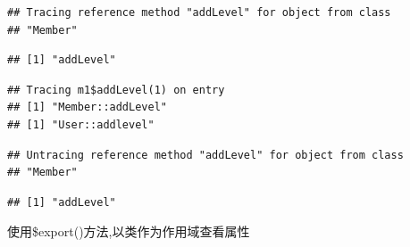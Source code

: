 \documentclass[]{book}
\newenvironment{Shaded}{\begin{snugshade}}{\end{snugshade}}
\newcommand{\KeywordTok}[1]{\textcolor[rgb]{0.13,0.29,0.53}{\textbf{#1}}}
\newcommand{\DecValTok}[1]{\textcolor[rgb]{0.00,0.00,0.81}{#1}}
\newcommand{\StringTok}[1]{\textcolor[rgb]{0.31,0.60,0.02}{#1}}
\newcommand{\CommentTok}[1]{\textcolor[rgb]{0.56,0.35,0.01}{\textit{#1}}}
\newcommand{\OperatorTok}[1]{\textcolor[rgb]{0.81,0.36,0.00}{\textbf{#1}}}
\newcommand{\NormalTok}[1]{#1}
\begin{document}
\begin{Shaded}
\end{Shaded}

\begin{verbatim}
## Tracing reference method "addLevel" for object from class
## "Member"
\end{verbatim}

\begin{verbatim}
## [1] "addLevel"
\end{verbatim}

\begin{Shaded}
\end{Shaded}

\begin{verbatim}
## Tracing m1$addLevel(1) on entry 
## [1] "Member::addLevel"
## [1] "User::addlevel"
\end{verbatim}

\begin{Shaded}
\end{Shaded}

\begin{verbatim}
## Untracing reference method "addLevel" for object from class
## "Member"
\end{verbatim}

\begin{verbatim}
## [1] "addLevel"
\end{verbatim}

使用\$export()方法,以类作为作用域查看属性

\begin{Shaded}
\end{Shaded}
\end{document}
